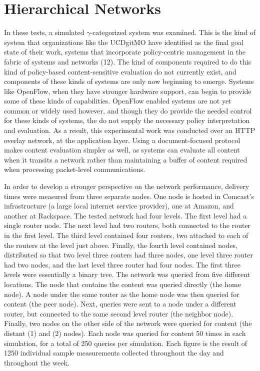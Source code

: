 \section{Hierarchical Networks}
In these tests, a simulated $\gamma$-categorized system was examined.  This is the kind of system that organizations like the UCDgitMO have identified as the final goal state of their work, systems that incorporate policy-centric management in the fabric of systems and networks (12).  The kind of components required to do this kind of policy-based content-sensitive evaluation do not currently exist, and components of these kinds of systems are only now beginning to emerge.  Systems like OpenFlow, when they have stronger hardware support, can begin to provide some of these kinds of capabilities.  OpenFlow enabled systems are not yet common or widely used however, and though they do provide the needed control for these kinds of systems, the do not supply the necessary policy interpretation and evaluation.  As a result, this experimental work was conducted over an HTTP overlay network, at the application layer.  Using a document-focused protocol makes content evaluation simpler as well, as systems can evaluate all content when it transits a network rather than maintaining a buffer of content required when processing packet-level communications.

In order to develop a stronger perspective on the network performance, delivery times were measured from three separate nodes.   One node is hosted in Comcast's infrastructure (a large local internet service provider), one at Amazon, and another at Rackspace.  The tested network had four levels.  The first level had a single router node.  The next level had two routers, both connected to the router in the first level.  The third level contained four routers, two attached to each of the routers at the level just above.  Finally, the fourth level contained nodes, distributed so that two level three routers had three nodes, one level three router had two nodes, and the last level three router had four nodes.  The first three levels were essentially a binary tree.  The network was queried from five different locations.  The node that contains the content was queried directly (the home node).  A node under the same router as the home node was then queried for content (the peer node).  Next, queries were sent to a node under a different router, but connected to the same second level router (the neighbor node).  Finally, two nodes on the other side of the network were queried for content (the distant (1) and (2) nodes).  Each node was queried for content 50 times in each simulation, for a total of 250 queries per simulation.  Each figure is the result of 1250 individual sample measurements collected throughout the day and throughout the week.

